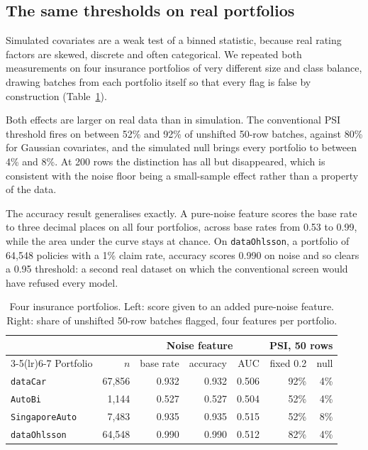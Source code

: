 \documentclass[11pt,a4paper]{article}
\theoremstyle{definition}
\begin{document}
\subsection{The same thresholds on real portfolios}

Simulated covariates are a weak test of a binned statistic, because real
rating factors are skewed, discrete and often categorical. We repeated both
measurements on four insurance portfolios \citep{insuranceData} of very
different size and class
balance, drawing batches from each portfolio itself so that every flag is
false by construction (Table~\ref{tab:real}).

Both effects are larger on real data than in simulation. The conventional PSI
threshold fires on between 52\% and 92\% of unshifted 50-row batches, against
80\% for Gaussian covariates, and the simulated null brings every portfolio to
between 4\% and 8\%. At 200 rows the distinction has all but disappeared,
which is consistent with the noise floor being a small-sample effect rather
than a property of the data.

The accuracy result generalises exactly. A pure-noise feature scores the base
rate to three decimal places on all four portfolios, across base rates from
0.53 to 0.99, while the area under the curve stays at chance. On
\texttt{dataOhlsson}, a portfolio of 64,548 policies with a 1\% claim rate,
accuracy scores 0.990 on noise and so clears a 0.95 threshold: a second real
dataset on which the conventional screen would have refused every model.

\begin{table}[ht]
\centering
\caption{Four insurance portfolios. Left: score given to an added pure-noise
feature. Right: share of unshifted 50-row batches flagged, four features per
portfolio.}
\label{tab:real}
\begin{tabular}{lrrrrrr}
\toprule
& & \multicolumn{3}{c}{Noise feature} & \multicolumn{2}{c}{PSI, 50 rows} \\
\cmidrule(lr){3-5}\cmidrule(lr){6-7}
Portfolio & $n$ & base rate & accuracy & AUC & fixed 0.2 & null \\
\midrule
\texttt{dataCar}       & 67{,}856 & 0.932 & 0.932 & 0.506 & 92\% & 4\% \\
\texttt{AutoBi}        &  1{,}144 & 0.527 & 0.527 & 0.504 & 52\% & 4\% \\
\texttt{SingaporeAuto} &  7{,}483 & 0.935 & 0.935 & 0.515 & 52\% & 8\% \\
\texttt{dataOhlsson}   & 64{,}548 & 0.990 & 0.990 & 0.512 & 82\% & 4\% \\
\bottomrule
\end{tabular}
\end{table}
\end{document}
